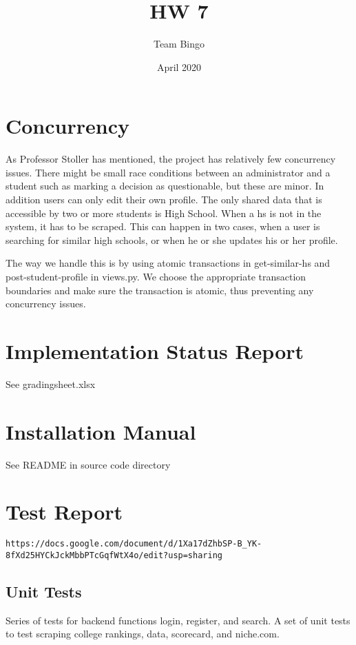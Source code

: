 \documentclass{article}
\title{HW 7}
\author{Team Bingo}
\date{April 2020}
\begin{document}
\maketitle

\section{Concurrency}
As Professor Stoller has mentioned, the project has relatively few concurrency
issues. There might be small race conditions between an administrator and a
student such as marking a decision as questionable, but these are minor. In
addition users can only edit their own profile. The only shared data that is
accessible by two or more students is High School. When a hs is not in the system, it has to
be scraped. This can happen in two cases, when a user is searching for similar
high schools, or when he or she updates his or her profile. 

The way we handle this is by using atomic transactions in get-similar-hs and
post-student-profile in views.py. We choose the appropriate transaction
boundaries and make sure the transaction is atomic, thus preventing any
concurrency issues.


\section{Implementation Status Report}
See gradingsheet.xlsx 

\section{Installation Manual}
See README in source code directory

\section{Test Report}

\begin{verbatim}
https://docs.google.com/document/d/1Xa17dZhbSP-B_YK-8fXd25HYCkJckMbbPTcGqfWtX4o/edit?usp=sharing
\end{verbatim}


\subsection{Unit Tests}
Series of tests for backend functions login, register, and search.
A set of unit tests to test scraping college rankings, data, scorecard, and
niche.com. 
\end{document}
